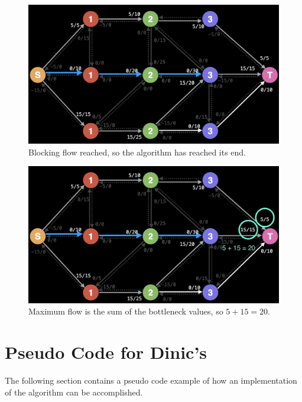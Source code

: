 \documentclass{report}
\begin{document}
\pagebreak
\begin{figure}[!htb]
    \includegraphics[width=\textwidth]{assets/visual07.png}
    \centering
    \captionsetup{justification=centering,margin=2cm}
    \caption{Blocking flow reached, so the algorithm has reached its end.}
\end{figure}
\begin{figure}[!htb]
    \includegraphics[width=\textwidth]{assets/visual08.png}
    \centering
    \captionsetup{justification=centering,margin=2cm}
    \caption{Maximum flow is the sum of the bottleneck values, so $5 + 15 = 20$.}
\end{figure}
\pagebreak

\section{Pseudo Code for Dinic's}
The following section contains a pseudo code example of how an implementation of the algorithm can be accomplished.

\makeatletter
\def\BState{\State\hskip-\ALG@thistlm}
\makeatother
\end{document}
